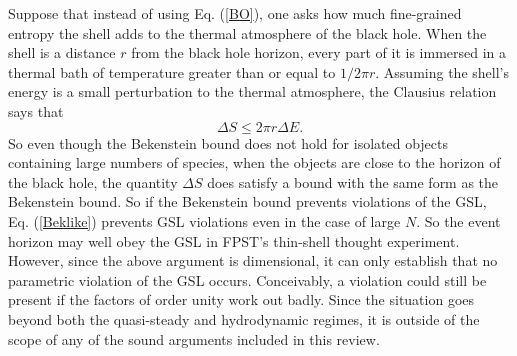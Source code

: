 \documentclass[12pt]{article}
\begin{document}
Suppose that instead of using Eq. (\ref{BO}), one asks how much fine-grained entropy the shell adds to the thermal atmosphere of the black hole.  When the shell is a distance $r$ from the black hole horizon, every part of it is immersed in a thermal bath of temperature greater than or equal to $1/{2\pi r}$.  Assuming the shell's energy is a small perturbation to the thermal atmosphere, the Clausius relation says that
\begin{equation}\label{Beklike}
\Delta S \le 2\pi r\Delta E.
\end{equation}
So even though the Bekenstein bound does not hold for isolated objects containing large numbers of species, when the objects are close to the horizon of the black hole, the quantity $\Delta S$ does satisfy a bound with the same form as the Bekenstein bound.  So if the Bekenstein bound prevents violations of the GSL, Eq. (\ref{Beklike}) prevents GSL violations even in the case of large $N$.  So the event horizon may well obey the GSL in FPST's thin-shell thought experiment.  However, since the above argument is dimensional, it can only establish that no parametric violation of the GSL occurs.  Conceivably, a violation could still be present if the factors of order unity work out badly.  Since the situation goes beyond both the quasi-steady and hydrodynamic regimes, it is outside of the scope of any of the sound arguments included in this review.
\end{document}
